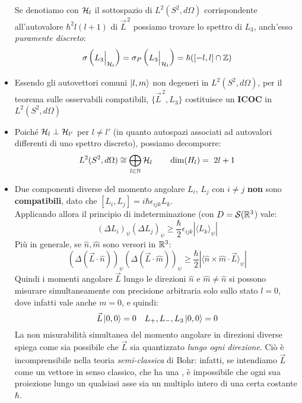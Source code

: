 \documentclass[../../FisicaTeorica.tex]{subfiles}
\begin{document}
\begin{itemize}
Se denotiamo con $\hs_l$ il sottospazio di $L^2(S^2, d\Omega)$ corrispondente all'autovalore $\hbar^2 l(l+1)$ di $\vec{L}^{\,2}$ possiamo trovare lo spettro di $L_3$, anch'esso \textit{puramente discreto}:
\[
\sigma\left(L_3 \Big|_{\hs_l} \right) = \sigma_P\left(L_3 \Big|_{\hs_l}\right) = \hbar([-l,l] \cap \bb{Z})
\]
\item Essendo gli autovettori comuni $\ket{l,m}$ non degeneri in $L^2(S^2, d\Omega)$, per il teorema sulle osservabili compatibili, $\{\vec{L}^{\,2}, L_3\}$ costituisce un \textbf{ICOC} in $L^2(S^2, d\Omega)$
\item Poiché $\hs_l \perp \hs_{l'}$ per $l\neq l'$ (in quanto autospazi associati ad autovalori differenti di uno spettro discreto), possiamo decomporre:
\[
L^2(S^2, d\Omega) \cong \bigoplus_{l\in \bb{N}} \hs_l \qquad \op{dim}(H_l) =\ 2l+1
\]
\item Due componenti diverse del momento angolare $L_i$, $L_j$ con $i\neq j$ \textbf{non} sono \textbf{compatibili}, dato che $[L_i, L_j]=i\hbar \epsilon_{ijk} L_k$.\\
Applicando allora il principio di indeterminazione (con $D=\mathcal{S}(\bb{R}^3$) vale:
\[
(\Delta L_i)_\psi(\Delta L_j)_\psi \geq \frac{\hbar}{2} \epsilon_{ijk} |\langle L_k \rangle_\psi| 
\]
Più in generale, se $\hat{n}, \hat{m}$ sono versori in $\bb{R}^3$:
\[
(\Delta (\vec{L}\cdot \hat{n}))_\psi (\Delta (\vec{L}\cdot \hat{m}))_\psi \geq \frac{\hbar}{2}|\langle \hat{n}\times \hat{m} \cdot \vec{L}\rangle_\psi|
\]
Quindi i momenti angolare $\vec{L}$ lungo le direzioni $\hat{n}$ e $\hat{m}\neq \hat{n}$ si possono misurare simultaneamente con precisione arbitraria solo sullo stato $l=0$, dove infatti vale anche $m=0$, e quindi:
\[
\vec{L}\ket{0,0}=0 \quad L_+, L_-, L_3\ket{0,0}=0
\]
La non misurabilità simultanea del momento angolare in direzioni diverse spiega come sia possibile che $\vec{L}$ sia quantizzato \textit{lungo ogni direzione}. Ciò è incomprensibile nella teoria \textit{semi-classica} di Bohr: infatti, se intendiamo $\vec{L}$ come un vettore in senso classico, che ha una , è impossibile che ogni sua proiezione lungo un qualsiasi asse sia un multiplo intero di una certa costante $\hbar$.
\begin{figure}[H]
\centering


\begin{tikzpicture}[x=0.75pt,y=0.75pt,yscale=-1,xscale=1]


\end{tikzpicture}
\end{figure}
\end{itemize}
\end{document}
